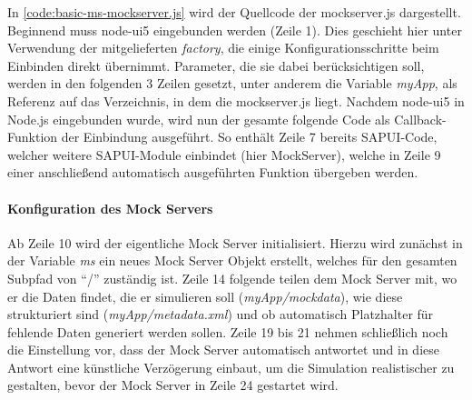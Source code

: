 In \autoref{code:basic-ms-mockserver.js} wird der Quellcode der mockserver.js dargestellt.
Beginnend muss node-ui5 eingebunden werden (Zeile 1).
Dies geschieht hier unter Verwendung der mitgelieferten \emph{factory}, die einige Konfigurationsschritte beim Einbinden direkt übernimmt.
Parameter, die sie dabei berücksichtigen soll, werden in den folgenden 3 Zeilen gesetzt, unter anderem die Variable \emph{myApp}, als Referenz auf das Verzeichnis, in dem die mockserver.js liegt.
Nachdem node-ui5 in Node.js eingebunden wurde, wird nun der gesamte folgende Code als Callback-Funktion der Einbindung ausgeführt.
So enthält Zeile 7 bereits SAPUI-Code, welcher weitere SAPUI-Module einbindet (hier MockServer), welche in Zeile 9 einer anschließend automatisch ausgeführten Funktion übergeben werden.

\paragraph{Konfiguration des Mock Servers}
Ab Zeile 10 wird der eigentliche Mock Server initialisiert.
Hierzu wird zunächst in der Variable \emph{ms} ein neues Mock Server Objekt erstellt, welches für den gesamten Subpfad von \enquote{/} zuständig ist.
Zeile 14 folgende teilen dem Mock Server mit, wo er die Daten findet, die er simulieren soll (\emph{myApp/mockdata}), wie diese strukturiert sind (\emph{myApp/metadata.xml}) und ob automatisch Platzhalter für fehlende Daten generiert werden sollen.
Zeile 19 bis 21 nehmen schließlich noch die Einstellung vor, dass der Mock Server automatisch antwortet und in diese Antwort eine künstliche Verzögerung einbaut, um die Simulation realistischer zu gestalten, bevor der Mock Server in Zeile 24 gestartet wird.~\cite{mock-srv-help}

